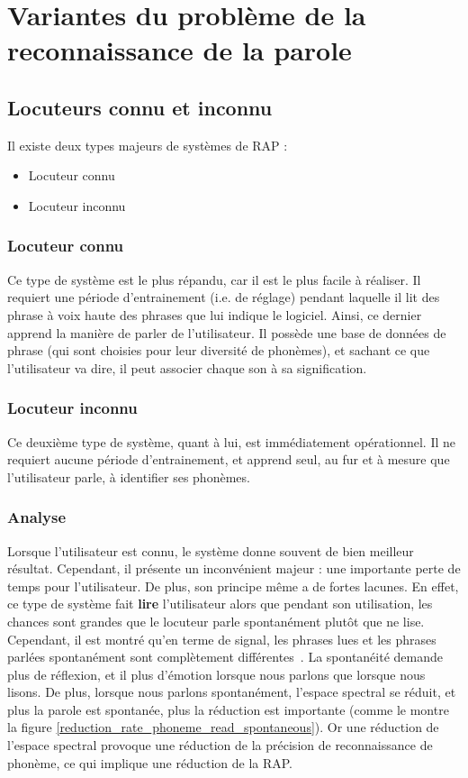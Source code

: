 	
	
	\section{Variantes du problème de la reconnaissance de la parole}
	
	\subsection{Locuteurs connu et inconnu}
	Il existe deux types majeurs de systèmes de RAP :
	\begin{itemize}
		\item Locuteur connu
		\item Locuteur inconnu
	\end{itemize}
	
	\subsubsection{Locuteur connu}
	Ce type de système est le plus répandu, car il est le plus facile à réaliser. Il requiert une période d'entrainement (i.e. de réglage) pendant laquelle il lit des phrase à voix haute des phrases que lui indique le logiciel. Ainsi, ce dernier apprend la manière de parler de l'utilisateur. Il possède une base de données de phrase (qui sont choisies pour leur diversité de phonèmes), et sachant ce que l'utilisateur va dire, il peut associer chaque son à sa signification.
	
	\subsubsection{Locuteur inconnu}
	Ce deuxième type de système, quant à lui, est immédiatement opérationnel. Il ne requiert aucune période d'entrainement, et apprend seul, au fur et à mesure que l'utilisateur parle, à identifier ses phonèmes.
	
	\subsubsection{Analyse}
	Lorsque l'utilisateur est connu, le système donne souvent de bien meilleur résultat. Cependant, il présente un inconvénient majeur : une importante perte de temps pour l'utilisateur. De plus, son principe même a de fortes lacunes. En effet, ce type de système fait \textbf{lire} l'utilisateur alors que pendant son utilisation, les chances sont grandes que le locuteur parle spontanément plutôt que ne lise. Cependant, il est montré qu'en terme de signal, les phrases lues et les phrases parlées spontanément sont complètement différentes~\cite{read-spontaneous}.  La spontanéité demande plus de réflexion, et il plus d'émotion lorsque nous parlons que lorsque nous lisons. De plus, lorsque nous parlons spontanément, l'espace spectral se réduit, et plus la parole est spontanée, plus la réduction est importante (comme le montre la figure \ref{reduction_rate_phoneme_read_spontaneous}). Or une réduction de l'espace spectral provoque une réduction de la précision de reconnaissance de phonème, ce qui implique une réduction de la RAP.
	
